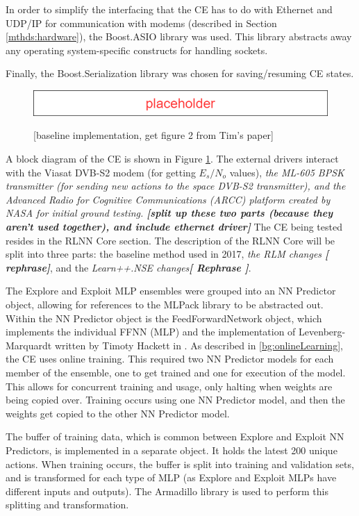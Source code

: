 \par In order to simplify the interfacing that the CE has to do with Ethernet and UDP/IP for communication with modems (described in Section \ref{mthds:hardware}), the Boost.ASIO \cite{placeholderCitation} library was used. This library abstracts away any operating system-specific constructs for handling sockets.
\par Finally, the Boost.Serialization \cite{placeholderCitation} library was chosen for saving/resuming CE states. 
\begin{figure}
\caption{[baseline implementation, get figure 2 from Tim's paper]}
\includegraphics{figures/Placeholder.png}
\label{fig:timOutlineBlocks}
\end{figure}
\par A block diagram of the CE is shown in Figure \ref{fig:timOutlineBlocks}. The external drivers interact with the Viasat DVB-S2 modem (for getting $E_s/N_o$ values), \textit{the ML-605 BPSK transmitter (for sending new actions to the space DVB-S2 transmitter), and the Advanced Radio for Cognitive Communications (ARCC) platform created by NASA for initial ground testing. \textbf{[split up these two parts (because they aren't used together), and include ethernet driver]}} The CE being tested resides in the RLNN Core section. The description of the RLNN Core will be split into three parts: the baseline method used in 2017, \textit{the RLM changes \textbf{[ rephrase]}}, and the \textit{Learn++.NSE changes\textbf{[ Rephrase ]}}.
\par The Explore and Exploit MLP ensembles were grouped into an NN Predictor object, allowing for references to the MLPack library to be abstracted out. Within the NN Predictor object is the FeedForwardNetwork object, which implements the individual FFNN (MLP) and the implementation of Levenberg-Marquardt written by Timoty Hackett in \cite{tim_implementation_paper}. As described in \ref{bg:onlineLearning}, the CE uses online training. This required two NN Predictor models for each member of the ensemble, one to get trained and one for execution of the model. This allows for concurrent training and usage, only halting when weights are being copied over. Training occurs using one NN Predictor model, and then the weights get copied to the other NN Predictor model. 
\par The buffer of training data, which is common between Explore and Exploit NN Predictors, is implemented in a separate object. It holds the latest 200 unique actions. When training occurs, the buffer is split into training and validation sets, and is transformed for each type of MLP (as Explore and Exploit MLPs have different inputs and outputs). The Armadillo library is used to perform this splitting and transformation.
